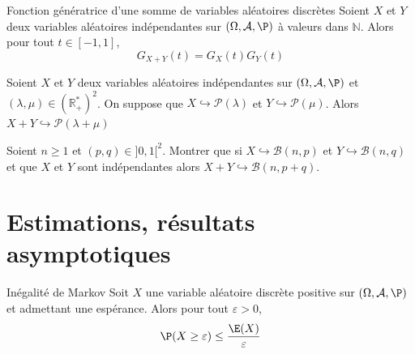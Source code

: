 \documentclass[french,11pt,twoside]{VcCours}
\begin{document}
\begin{Proposition}{Fonction génératrice d'une somme de variables aléatoires discrètes}
Soient $X$ et $Y$ deux variables aléatoires indépendantes sur $(\Omega, \mathcal{A}, \P)$ à valeurs dans $\mathbb{N}$. Alors pour tout $t \in [-1,1]$,
$$ G_{X+Y}(t) = G_X(t) G_Y(t)$$
\end{Proposition}

\begin{Demonstration}{}

\vspace*{3cm}
\end{Demonstration}

\begin{Corollaire}{} Soient $X$ et $Y$ deux variables aléatoires indépendantes sur $(\Omega, \mathcal{A}, \P)$ et $(\lambda, \mu) \in (\mathbb{R}_+^{*})^2$. On suppose que $X \hookrightarrow \mathcal{P}(\lambda)$ et $Y \hookrightarrow \mathcal{P}(\mu)$. Alors $X+Y \hookrightarrow \mathcal{P}(\lambda+\mu)$
\end{Corollaire}

\begin{Demonstration}{}

\vspace*{5cm}
\end{Demonstration}

\begin{ApplicationDirecte}{} Soient $n \geq 1$ et $(p,q) \in ]0,1[^2$. Montrer que si $X \hookrightarrow \mathcal{B}(n,p)$ et $Y \hookrightarrow \mathcal{B}(n,q)$ et que $X$ et $Y$ sont indépendantes alors $X+Y \hookrightarrow \mathcal{B}(n,p+q)$.
\end{ApplicationDirecte}

\section{Estimations, résultats asymptotiques}

\begin{Theoreme}{Inégalité de Markov}
Soit $X$ une variable aléatoire discrète positive sur $(\Omega, \mathcal{A}, \P)$ et admettant une espérance. Alors pour tout $\varepsilon>0$,
$$ \P(X \geq \varepsilon) \leq \dfrac{\E(X)}{\varepsilon}$$
\end{Theoreme}

\begin{Demonstration}{}

\vspace*{5cm}
\end{Demonstration}
\end{document}
